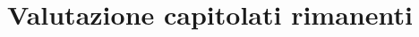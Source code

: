 \section{Valutazione capitolati rimanenti} 
\label{capitolati_rimanenti}


\newpage

\newpage

\newpage

\newpage

\newpage

\newpage

\newpage

